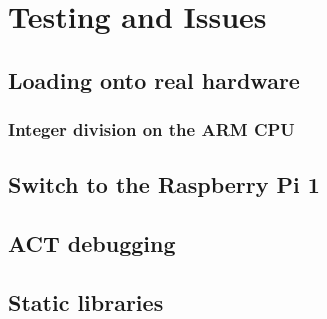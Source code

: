 \section{Testing and Issues}
\subsection{Loading onto real hardware}
    \subsubsection{Integer division on the ARM CPU}
\subsection{Switch to the Raspberry Pi 1}
\subsection{ACT debugging}
\subsection{Static libraries}
